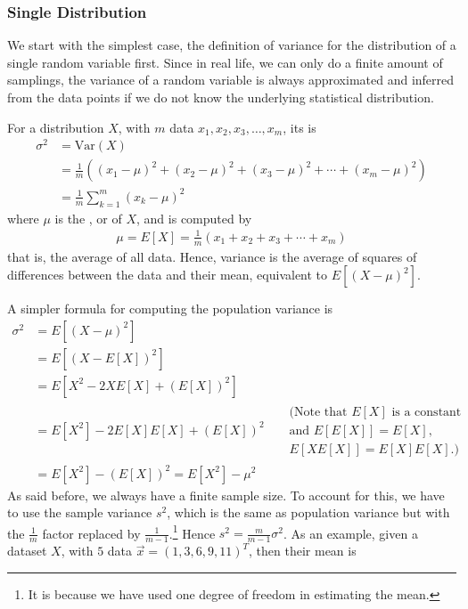 \subsubsection{Single Distribution}
We start with the simplest case, the definition of variance for the distribution of a single random variable first. Since in real life, we can only do a finite amount of samplings, the variance of a random variable is always approximated and inferred from the data points if we do not know the underlying statistical distribution.
\begin{defn}
\label{defn:variance}
For a distribution $X$, with $m$ data $x_1, x_2, x_3, \ldots, x_m$, its  is
\begin{subequations}
\label{eqn:variance}
\begin{align}
\sigma^2 &= \text{Var}(X) \nonumber\\
&= \frac{1}{m} ((x_1 - \mu)^2 + (x_2 - \mu)^2 + (x_3 - \mu)^2 + \cdots + (x_m - \mu)^2) \\
&= \frac{1}{m} \sum_{k=1}^m (x_k - \mu)^2 \label{eqn:varianceb}
\end{align}    
\end{subequations}
where $\mu$ is the , or  of $X$, and is computed by
\begin{align}
\mu = E[X] = \frac{1}{m} (x_1 + x_2 + x_3 + \cdots + x_m)
\end{align}
that is, the average of all data. Hence, variance is the average of squares of differences between the data and their mean, equivalent to $E[(X-\mu)^2]$.
\end{defn}
A simpler formula for computing the population variance is
\begin{align}
\sigma^2 &= E[(X-\mu)^2] \nonumber \\
&= E[(X-E[X])^2] \nonumber \\
&= E[X^2-2XE[X]+(E[X])^2] \nonumber \\
&= E[X^2] - 2E[X]E[X] + (E[X])^2 \nonumber & \begin{aligned} &\text{(Note that $E[X]$ is a constant}\\ &\text{and $E[E[X]] = E[X]$,} \\
&\text{$E[XE[X]] = E[X]E[X]$.)}\end{aligned} \\
&= E[X^2] - (E[X])^2 = E[X^2] - \mu^2 \label{eqn:varshortcut}
\end{align}
As said before, we always have a finite sample size. To account for this, we have to use the sample variance $s^2$, which is the same as population variance but with the $\frac{1}{m}$ factor replaced by $\frac{1}{m-1}$.\footnote{It is because we have used one degree of freedom in estimating the mean.} Hence $s^2 = \frac{m}{m-1}\sigma^2$. As an example, given a dataset $X$, with $5$ data $\vec{x} = (1, 3, 6, 9, 11)^T$, then their mean is
